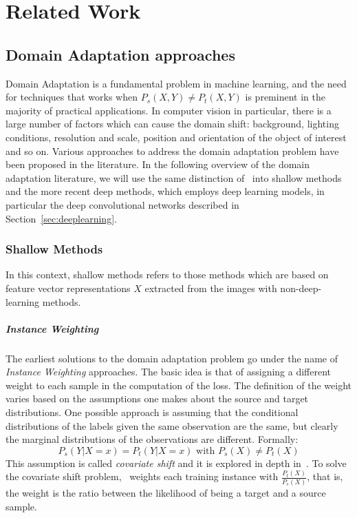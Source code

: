 \documentclass[../main.tex]{subfiles}
\begin{document}
    \chapter{Related Work}

    \section{Domain Adaptation approaches}\label{sec:related-word}
	Domain Adaptation is a fundamental problem in machine learning, and the need for techniques that works when
	$P_{s}(X, Y) \neq P_{t}(X, Y)$ is preminent in the majority of practical applications. In computer vision in particular,
	there is a large number of factors which can cause the domain shift: background, lighting conditions, resolution and scale,
	position and orientation of the object of interest and so on. Various approaches to address the domain adaptation problem
	have been proposed in the literature. In the following overview of the domain adaptation literature, we will use the same
	distinction of~\cite{DBLP:journals/corr/Csurka17} into shallow methods and the more recent deep methods, which employs
	deep learning models, in particular the deep convolutional networks described in Section~\ref{sec:deeplearning}.

    \subsection{Shallow Methods}
	In this context, shallow methods refers to those methods which are based on feature vector representations $X$ extracted from
	the images with non-deep-learning methods.

	\paragraph{Instance Weighting}
	The earliest solutions to the domain adaptation problem go under the name
	of \textit{Instance Weighting} approaches.
	The basic idea is that of assigning a different weight to each sample in the computation of the loss. The definition of the
	weight varies based on the assumptions one makes about the source and target distributions. One possible approach is assuming
	that the conditional distributions of the labels given the same observation are the same, but clearly the marginal distributions
	of the observations are different. Formally:
	$$ P_{s}(Y | X = x) = P_{t}(Y | X = x) \text{ with } P_{s}(X) \neq P_{t}(X) $$
	This assumption is called \textit{covariate shift} and it is explored in depth in~\cite{shimoidara2000}. To solve the covariate
	shift problem,~\cite{shimoidara2000} weights each training instance with $\frac{P_{t}(X)}{P_{s}(X)}$, that is, the weight is the
	ratio between the likelihood of being a target and a source sample.
\end{document}
